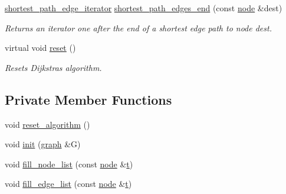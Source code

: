 \begin{DoxyCompactItemize}
\mbox{\hyperlink{classdijkstra_afb9a918f95b13aefcef331896fe3b41c}{shortest\+\_\+path\+\_\+edge\+\_\+iterator}} \mbox{\hyperlink{classdijkstra_a031e6fef10aa40aad10edc1053ad9cf0}{shortest\+\_\+path\+\_\+edges\+\_\+end}} (const \mbox{\hyperlink{classnode}{node}} \&dest)
\begin{DoxyCompactList}\small\item\em Returns an iterator one after the end of a shortest edge path to node {\ttfamily dest}. \end{DoxyCompactList}\item 
virtual void \mbox{\hyperlink{classdijkstra_a444c288b3a49ec1c2973459dad55ffb3}{reset}} ()
\begin{DoxyCompactList}\small\item\em Resets Dijkstra\textquotesingle{}s algorithm. \end{DoxyCompactList}\end{DoxyCompactItemize}
\subsection*{Private Member Functions}
\begin{DoxyCompactItemize}
\item 
void \mbox{\hyperlink{classdijkstra_a70bec540a7f67970a9f19b60c5cbaedd}{reset\+\_\+algorithm}} ()
\item 
void \mbox{\hyperlink{classdijkstra_a6dafb552780e09a56b87e2a33a98e74b}{init}} (\mbox{\hyperlink{classgraph}{graph}} \&G)
\item 
void \mbox{\hyperlink{classdijkstra_a71ad317c485ce76d3d22399f1a8c83fe}{fill\+\_\+node\+\_\+list}} (const \mbox{\hyperlink{classnode}{node}} \&\mbox{\hyperlink{classdijkstra_a6c42e614aabfbef25b5acfb543fbe1d1}{t}})
\item 
void \mbox{\hyperlink{classdijkstra_ab2dfb6e0c2b9084fa17e2e6349e20ad9}{fill\+\_\+edge\+\_\+list}} (const \mbox{\hyperlink{classnode}{node}} \&\mbox{\hyperlink{classdijkstra_a6c42e614aabfbef25b5acfb543fbe1d1}{t}})
\end{DoxyCompactItemize}
